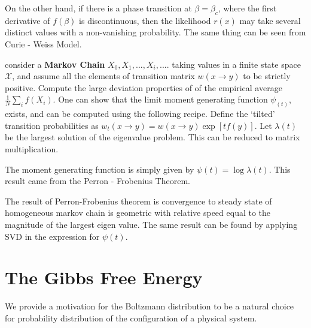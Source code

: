 \documentclass[letterpaper,english,10pt]{article}
\begin{document}
On the other hand, if there is a phase transition at $\beta = \beta_c$, 
where the first derivative of $f(\beta)$ is discontinuous, 
then the likelihood $r(x)$ may take several distinct values with a non-vanishing probability. 
The same thing can be seen from Curie - Weiss Model.


\begin{shaded}
\begin{exmp}
consider a \textbf{Markov Chain} $X_0, X_1, ...,X_i,....$ taking values in a finite state space $\mathcal{X}$, and assume all the elements of transition matrix $w(x \to y)$ to be strictly positive. Compute the large deviation properties of of the empirical average $\frac{1}{N}\sum_{i}f(X_i)$.
One can show that the limit moment generating function $\psi_(t)$,
exists, and can be computed using the following recipe. Define the `tilted’ transition probabilities as $w_t(x \to y) = w(x \to y) \exp[t f(y)]$. Let $\lambda(t)$ be the largest solution of the eigenvalue problem.
This can be reduced to matrix multiplication.

The moment generating function is simply given by $\psi(t) = \log \lambda(t)$. This result came from the Perron - Frobenius Theorem.

The result of Perron-Frobenius theorem is convergence to steady state of homogeneous markov chain is geometric with relative speed equal to the magnitude of the largest eigen value. 
The same result can be found by applying SVD in the expression for $\psi(t)$.

\end{exmp}
\end{shaded}

\section{The Gibbs Free Energy} 
We provide a motivation for the Boltzmann distribution to be a natural choice for probability distribution of the configuration of a physical system. 
\end{document}
